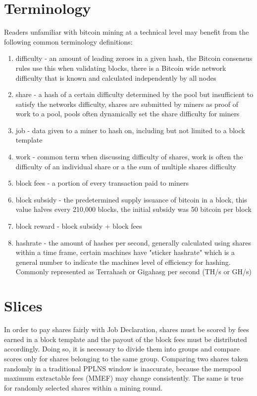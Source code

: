 \documentclass[11pt]{article}
\begin{document}
\section{Terminology}

Readers unfamiliar with bitcoin mining at a technical level may benefit from the following common terminology definitions:

\begin{enumerate}
	\item difficulty - an amount of leading zeroes in a given hash, the Bitcoin consensus rules use this when validating blocks, there is a Bitcoin wide network difficulty that is known and calculated independently by all nodes
	\item share - a hash of a certain difficulty determined by the pool but insufficient to satisfy the networks difficulty, shares are submitted by miners as proof of work to a pool, pools often dynamically set the share difficulty for miners
	\item job - data given to a miner to hash on, including but not limited to a block template
	\item work - common term when discussing difficulty of shares, work is often the difficulty of an individual share or a the sum of multiple shares difficulty
	\item block fees - a portion of every transaction paid to miners
	\item block subsidy - the predetermined supply issuance of bitcoin in a block, this value halves every 210,000 blocks, the initial subsidy was 50 bitcoin per block
	\item block reward - block subsidy + block fees
	\item hashrate - the amount of hashes per second, generally calculated using shares within a time frame, certain machines have "sticker hashrate" which is a general number to indicate the machines level of efficiency for hashing. Commonly represented as Terrahash or Gigahasg per second (TH/s or GH/s)
\end{enumerate}

\section{Slices}
In order to pay shares fairly with Job Declaration, shares must be scored by fees earned in a block template and the payout of the block fees must be distributed accordingly. Doing so, it is necessary to divide them into groups and compare scores only for shares belonging to the same group. Comparing two shares taken randomly in a traditional PPLNS window is inaccurate, because the mempool maximum extractable fees (MMEF) may change consistently. The same is true for randomly selected shares within a mining round.
\end{document}
